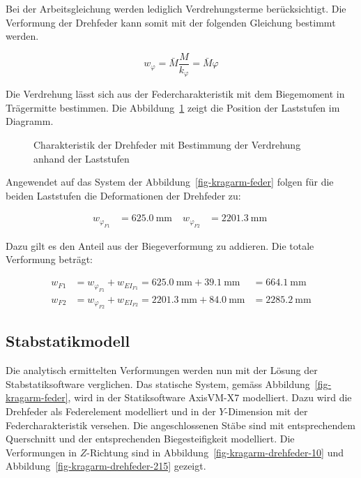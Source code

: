 \documentclass[
  11pt,
  letterpaper,
]{scrreprt}
\begin{document}
Bei der Arbeitsgleichung werden lediglich Verdrehungsterme
berücksichtigt. Die Verformung der Drehfeder kann somit mit der
folgenden Gleichung bestimmt werden.

\[
w_{\varphi} = \bar{M} \frac{M}{k_\varphi} = \bar{M} \varphi
\]

Die Verdrehung lässt sich aus der Federcharakteristik mit dem
Biegemoment in Trägermitte bestimmen. Die
Abbildung~\ref{fig-feder-force} zeigt die Position der Laststufen im
Diagramm.

\begin{figure}[H]


\caption{\label{fig-feder-force}Charakteristik der Drehfeder mit
Bestimmung der Verdrehung anhand der Laststufen}

\end{figure}%

Angewendet auf das System der Abbildung~\ref{fig-kragarm-feder} folgen
für die beiden Laststufen die Deformationen der Drehfeder zu:

$$
\begin{aligned}
w_{\varphi_{F1}} &= 625.0\ \mathrm{mm} \; 
 &w_{\varphi_{F2}} &= 2201.3\ \mathrm{mm} \;
\end{aligned}
$$

Dazu gilt es den Anteil aus der Biegeverformung zu addieren. Die totale
Verformung beträgt:

$$
\begin{aligned}
w_{F1} &= w_{\varphi_{F1}} + w_{EI_{F1}}  = 625.0\ \mathrm{mm} + 39.1\ \mathrm{mm} &= 664.1\ \mathrm{mm}  
\\[11pt]
w_{F2} &= w_{\varphi_{F2}} + w_{EI_{F2}}  = 2201.3\ \mathrm{mm} + 84.0\ \mathrm{mm} &= 2285.2\ \mathrm{mm}  
\end{aligned}
$$

\subsection{Stabstatikmodell}\label{stabstatikmodell}

Die analytisch ermittelten Verformungen werden nun mit der Lösung der
Stabstatiksoftware verglichen. Das statische System, gemäss
Abbildung~\ref{fig-kragarm-feder}, wird in der Statiksoftware AxisVM-X7
modelliert. Dazu wird die Drehfeder als Federelement modelliert und in
der \(Y\)-Dimension mit der Federcharakteristik versehen. Die
angeschlossenen Stäbe sind mit entsprechendem Querschnitt und der
entsprechenden Biegesteifigkeit modelliert. Die Verformungen in
\(Z\)-Richtung sind in Abbildung~\ref{fig-kragarm-drehfeder-10} und
Abbildung~\ref{fig-kragarm-drehfeder-215} gezeigt.
\end{document}
